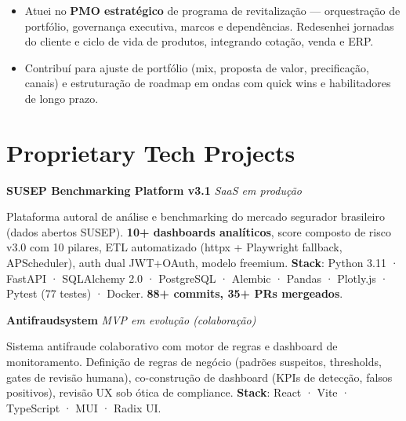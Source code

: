 \documentclass[10pt, a4paper]{article}
\newcommand{\achievement}[1]{%
  \item[\textcolor{ExecutiveNavy}{\textbf{•}}] \RaggedRight #1%
}
\begin{document}
\begin{itemize}[leftmargin=1.2em, itemsep=0.3em, parsep=0pt, topsep=0.3em]

\achievement{Atuei no \textbf{PMO estratégico} de programa de revitalização — orquestração de portfólio, governança executiva, marcos e dependências. Redesenhei jornadas do cliente e ciclo de vida de produtos, integrando cotação, venda e ERP.}

\achievement{Contribuí para ajuste de portfólio (mix, proposta de valor, precificação, canais) e estruturação de roadmap em ondas com quick wins e habilitadores de longo prazo.}

\end{itemize}

\vspace{0.8em}

\section*{Proprietary Tech Projects}

\textbf{\sffamily\color{ExecutiveNavy}SUSEP Benchmarking Platform v3.1} \hfill {\itshape\small SaaS em produção}

{\small Plataforma autoral de análise e benchmarking do mercado segurador brasileiro (dados abertos SUSEP). \textbf{10+ dashboards analíticos}, score composto de risco v3.0 com 10 pilares, ETL automatizado (httpx + Playwright fallback, APScheduler), auth dual JWT+OAuth, modelo freemium. \textbf{Stack}: Python 3.11 · FastAPI · SQLAlchemy 2.0 · PostgreSQL · Alembic · Pandas · Plotly.js · Pytest (77 testes) · Docker. \textbf{88+ commits, 35+ PRs mergeados}.}

\vspace{0.5em}

\textbf{\sffamily\color{ExecutiveNavy}Antifraudsystem} \hfill {\itshape\small MVP em evolução (colaboração)}

{\small Sistema antifraude colaborativo com motor de regras e dashboard de monitoramento. Definição de regras de negócio (padrões suspeitos, thresholds, gates de revisão humana), co-construção de dashboard (KPIs de detecção, falsos positivos), revisão UX sob ótica de compliance. \textbf{Stack}: React · Vite · TypeScript · MUI · Radix UI.}

\vspace{0.8em}
\end{document}
